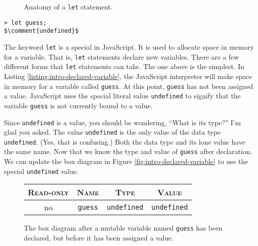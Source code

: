 \begin{figure}
  
  \caption{Anatomy of a \texttt{let} statement.}
\end{figure}

\reactivatelinenumbers
\begin{lstlisting}[caption={\label{listing:intro-declared-variable} The NodeJS
syntax to create a mutable variable named \texttt{guess}. The result is a value
whose box diagram is \ref{fig:intro-declared-variable}.}, escapeinside=$$]
> let guess;
$\comment{undefined}$
\end{lstlisting}
\suppresslinenumbers

The keyword \texttt{let} is a special in JavaScript. It is used to allocate
space in memory for a variable. That is, \texttt{let} statements declare new
variables. There are a few different forms that \texttt{let} statements can
take. The one above is the simplest. In Listing
\ref{listing:intro-declared-variable}, the JavaScript interpreter will make
space in memory for a variable called \texttt{guess}. At this point,
\texttt{guess} has not been assigned a value. JavaScript uses the special
literal value \texttt{undefined} to signify that the variable \texttt{guess} is
not currently bound to a value.

Since \texttt{undefined} is a value, you should be wondering, ``What is its
type?'' I'm glad you asked. The value \texttt{undefined} is the only value of
the data type \texttt{undefined}. (Yes, that is confusing.) Both the data type
and its lone value have the same name. Now that we know the type and value of \texttt{guess} after declaration.
We can update the box diagram in Figure \ref{fig:intro-declared-variable} to use
the special \texttt{undefined} value.

\begin{figure}[h]
  \sffamily
  \color{cyan}
  \begin{tabular}{|c|c|c|c|}
    \hline
    \textsc{Read-only} & \textsc{Name} & \textsc{Type} & \textsc{Value}\\
    \hline
    no & \texttt{guess} & \texttt{undefined} & \texttt{undefined}\\
    \hline
  \end{tabular}
\caption{\label{fig:intro-undefined-variable} The box diagram after a mutable
variable named \texttt{guess} has been declared, but before it has been assigned
a value.}
\end{figure}

